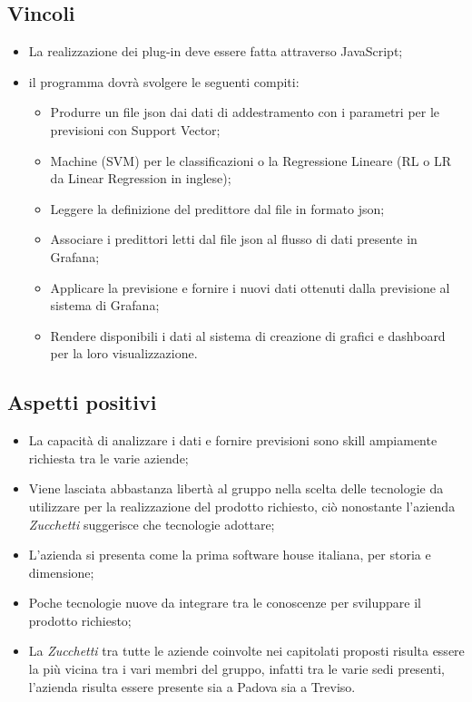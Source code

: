 \subsection{Vincoli}
\begin{itemize}
\item La realizzazione dei plug-in deve essere fatta attraverso JavaScript;
\item il programma dovr\`a svolgere le seguenti compiti:
\begin{itemize}
\item Produrre un file json dai dati di addestramento con i parametri per le previsioni con Support Vector;
\item Machine (SVM) per le classificazioni o la Regressione Lineare (RL o LR da Linear Regression in inglese);
\item Leggere la definizione del predittore dal file in formato json;
\item Associare i predittori letti dal file json al flusso di dati presente in Grafana;
\item Applicare la previsione e fornire i nuovi dati ottenuti dalla previsione al sistema di Grafana;
\item Rendere disponibili i dati al sistema di creazione di grafici e dashboard per la loro visualizzazione.
\end{itemize}
\end{itemize}

\subsection{Aspetti positivi}
\begin{itemize}
\item La capacit\`a di analizzare i dati e fornire previsioni sono skill ampiamente richiesta tra le varie aziende;
\item Viene lasciata abbastanza libertà al gruppo nella scelta delle tecnologie da utilizzare per la realizzazione del prodotto richiesto, ciò nonostante l'azienda \textit{Zucchetti} suggerisce che tecnologie adottare;
\item L'azienda si presenta come la prima software house italiana, per storia e dimensione;
\item Poche tecnologie nuove da integrare tra le conoscenze per sviluppare il prodotto richiesto;
\item La \textit{Zucchetti} tra tutte le aziende coinvolte nei capitolati proposti risulta essere la pi\`u vicina tra i vari membri del gruppo, infatti tra le varie sedi presenti, l'azienda risulta essere presente sia a Padova sia a Treviso.

\end{itemize}

